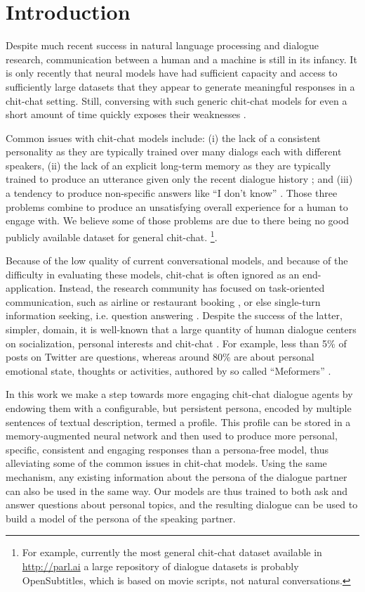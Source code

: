 \section{Introduction}

Despite much recent success in natural language processing and dialogue research, communication between a human and a machine is still in its infancy.
It is only recently that neural models have had sufficient capacity and access to sufficiently large datasets that they appear to generate meaningful responses in a chit-chat setting. Still, conversing with such generic chit-chat models for even a short amount of 
time quickly exposes their weaknesses \citep{serban2016generative,vinyals2015neural}.


Common issues with chit-chat models  
include:
(i) the lack of a consistent personality \citep{li2016persona} as they are typically trained over many dialogs each with different speakers,  (ii)
the lack of an explicit long-term memory as they are typically trained to produce an utterance given only the recent dialogue history \citep{vinyals2015neural}; and  (iii)
a tendency to produce non-specific answers like ``I don't know'' \citep{li2015diversity}. 
Those three problems combine to produce an unsatisfying overall experience for a human to engage with. We believe some of those problems are due to there being no good publicly available dataset for general chit-chat. 
\ifarxiv
\footnote{For example,  currently the  most general chit-chat dataset available in \url{http://parl.ai} a large repository of dialogue datasets is probably OpenSubtitles, which is based on movie scripts, not natural conversations.}.
\fi

Because of the low quality of current conversational models, and because of the difficulty in evaluating these models, chit-chat
is often ignored as an end-application.  Instead, the research community has focused on 
 task-oriented communication,
 such as airline or restaurant booking \citep{bordes2016learning}, or else single-turn information seeking, i.e. question answering \cite{rajpurkar2016squad}. 
Despite the success of the latter, simpler, domain,
it is well-known that a large quantity of human dialogue centers on socialization, personal interests and chit-chat \citep{dunbar1997human}. For example, less than 5\% of posts on Twitter are questions, whereas around 80\% are about personal emotional state, thoughts or activities, authored by so called ``Meformers'' \citep{naaman2010really}.

In this work we make a step towards more engaging chit-chat dialogue agents by endowing them with a configurable, but persistent persona, encoded by multiple sentences of textual description, termed a profile. This profile can be stored in a memory-augmented neural network and then used to produce more personal, specific, consistent and engaging responses than a persona-free model, thus alleviating some of the common issues in chit-chat models.
Using the same mechanism, any existing information about the persona of the dialogue partner can also be used in the same way. Our models are thus trained to both ask and answer questions about personal topics, and the resulting dialogue can be used to build a model of the persona of the speaking partner.


